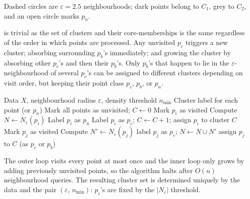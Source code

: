 \newpage
{} Dashed circles are $\varepsilon{=}2.5$ neighbourhoods; 
dark points belong to $C_1$, grey to $C_2$, and an open circle marks $p_n$.

 is trivial as the set of clusters
and their core-memberships is the same regardless of the order in which points are processed. 
Any unvisited $p_c$ triggers a new cluster; absorbing surrounding $p_b$'s immediately; and growing the cluster by absorbing 
other $p_c$'s and then their $p_b$'s. Only $p_b$'s that happen to lie in the $\varepsilon$-neighbourhood of several $p_c$'s 
can be assigned to different clusters depending on visit order, but keeping their point class $p_c$, $p_b$, or $p_n$.

\vspace{1.5em}
\begin{algorithm}[H]
\caption{Naive Density-Based Clustering (DBSCAN)}
\begin{algorithmic}[1]
\Require Data $X$, neighbourhood radius $\varepsilon$, density threshold $n_{\min}$
\Ensure Cluster label for each point (or $p_n$)
\State Mark all points as unvisited; $C \gets 0$
    \State Mark $p_i$ as visited
    \State Compute $N \gets N_\varepsilon(p_i)$
        \State Label $p_i$ as $p_n$
    \Else
        \State Label $p_i$ as $p_c$; $C \gets C + 1$; assign $p_i$ to cluster $C$
                \State Mark $p_j$ as visited
                \State Compute $N' \gets N_\varepsilon(p_j)$
                 label $p_j$ as $p_c$; $N \gets N \cup N'$ \EndIf
            \EndIf
             assign $p_j$ to $C$ (as $p_c$ or $p_b$) \EndIf
        \EndFor
    \EndIf
\EndFor
\end{algorithmic}
\end{algorithm}
\vspace{1.5em}


 The outer loop visits every point at most once and the inner 
loop only grows by adding previously unvisited points, so the algorithm halts after $O(n)$ neighbourhood queries. 
The resulting cluster set is determined uniquely by the data and the pair $(\varepsilon,\,n_{\min})$: $p_c$'s 
are fixed by the $|N_\varepsilon|$ threshold.






